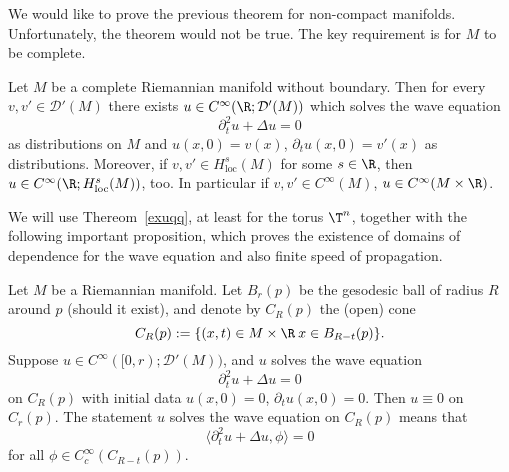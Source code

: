 \documentclass[12pt]{article}
\begin{document}
We would like to prove the previous theorem for non-compact manifolds. Unfortunately, the theorem would not be true. The key requirement is for $M$ to be complete.
\begin{thm}\label{exuq}Let $M$ be a complete Riemannian manifold without boundary. Then for every $v,v' \in \mathcal D'(M)$ there exists $u \in C^\infty(\R;\mathcal D'(M))$ which solves the wave equation
\[\partial_t^2 u + \Delta u = 0\] as distributions on $M$ and $u(x,0) = v(x)$, $\partial_t u(x,0) = v'(x)$ as distributions. Moreover, if $v,v' \in H^s_{\text{loc}}(M)$ for some $s \in \R$, then $u \in C^\infty(\R;H^s_{\text{loc}}(M))$, too. In particular if $v,v' \in C^\infty(M)$, $u \in C^\infty(M\times \R)$.\end{thm}
We will use Thereom~\ref{exuqq}, at least for the torus $\T^n$, together with the following important proposition, which proves the existence of domains of dependence for the wave equation and also finite speed of propagation.
\begin{prop}Let $M$ be a Riemannian manifold. Let $B_r(p)$ be the gesodesic ball of radius $R$ around $p$ (should it exist), and denote by $C_R(p)$ the (open) cone
\[C_R(p) := \{(x,t) \in M\times \R\: x \in B_{R-t}(p)\}.\] Suppose $u \in C^\infty([0,r);\mathcal D'(M))$, and $u$ solves the wave equation \[\partial_t^2 u + \Delta u = 0\] on $C_R(p)$ with initial data $u(x,0) = 0$, $\partial_t u(x,0) = 0$. Then $u \equiv 0$ on $C_r(p)$. The statement $u$ solves the wave equation on $C_R(p)$ means that
\[\langle \partial_t^2 u + \Delta u,\phi\rangle = 0\]
for all $\phi \in C_c^\infty(C_{R-t}(p))$.\end{prop}
\end{document}
